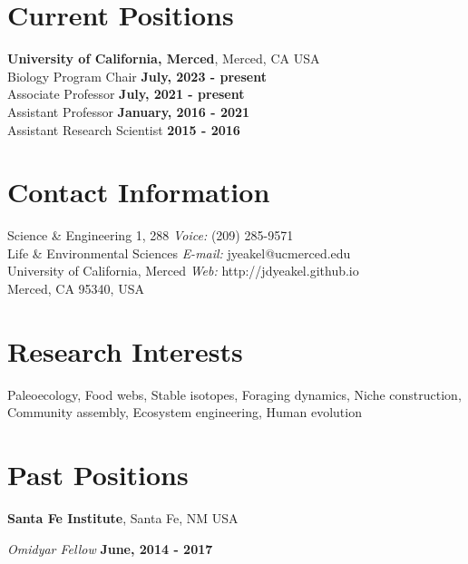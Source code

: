 \documentclass[margin,line,12pt]{res}
\begin{document}

\begin{resume}

\section{\sc Current Positions}
{\bf University of California, Merced}, Merced, CA USA\\
Biology Program Chair \hfill {\bf July, 2023 - present} \\
Associate Professor \hfill {\bf July, 2021 - present} \\
Assistant Professor \hfill {\bf January, 2016 - 2021} \\
Assistant Research Scientist \hfill {\bf 2015 - 2016}

\section{\sc Contact Information}
Science \& Engineering 1, 288             \hfill {\it Voice:}  (209) 285-9571 \\
Life \& Environmental Sciences   \hfill {\it E-mail:}  jyeakel@ucmerced.edu \\
University of California, Merced  \hfill {\it Web:} http://jdyeakel.github.io\\
Merced, CA 95340, USA  \hfill  \\


\section{\sc Research Interests}
Paleoecology,
Food webs,
Stable isotopes,
Foraging dynamics,
Niche construction,
Community assembly,
Ecosystem engineering,
Human evolution

\section{\sc Past Positions}
{\bf Santa Fe Institute}, Santa Fe, NM USA

\vspace{-.3cm}
{\em Omidyar Fellow} \hfill {\bf June, 2014 - 2017}\\
\vspace{-.3cm}


\end{resume}
\end{document}

